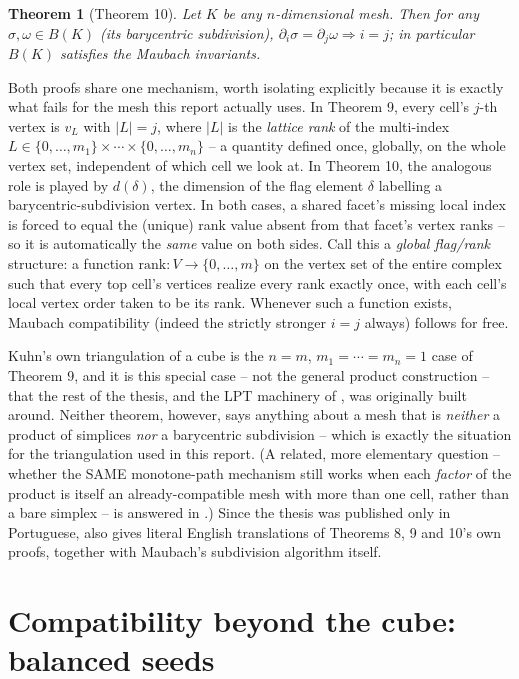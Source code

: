 \documentclass[11pt]{article}
\newtheorem*{thmthm}{Theorem}
\begin{document}
\begin{thmthm}[Theorem 10]
Let $K$ be any $n$-dimensional mesh. Then for any $\sigma,\omega\in B(K)$
(its barycentric subdivision), $\partial_i\sigma=\partial_j\omega
\Rightarrow i=j$; in particular $B(K)$ satisfies the Maubach invariants.
\end{thmthm}

Both proofs share one mechanism, worth isolating explicitly because it is
exactly what fails for the mesh this report actually uses. In Theorem 9,
every cell's $j$-th vertex is $v_L$ with $|L|=j$, where $|L|$ is the
\emph{lattice rank} of the multi-index $L\in\{0,\dots,m_1\}\times\cdots
\times\{0,\dots,m_n\}$ -- a quantity defined once, globally, on the whole
vertex set, independent of which cell we look at. In Theorem 10, the
analogous role is played by $d(\delta)$, the dimension of the flag element
$\delta$ labelling a barycentric-subdivision vertex. In both cases, a
shared facet's missing local index is forced to equal the (unique) rank
value absent from that facet's vertex ranks -- so it is automatically the
\emph{same} value on both sides. Call this a \emph{global flag/rank}
structure: a function $\mathrm{rank}:V\to\{0,\dots,m\}$ on the vertex set of
the entire complex such that every top cell's vertices realize every rank
exactly once, with each cell's local vertex order taken to be its rank.
Whenever such a function exists, Maubach compatibility (indeed the
strictly stronger $i=j$ always) follows for free.

Kuhn's own triangulation of a cube is the $n=m$, $m_1=\cdots=m_n=1$ case of
Theorem 9, and it is this special case -- not the general product
construction -- that the rest of the thesis, and the LPT machinery of
, was originally built around. Neither theorem, however, says
anything about a mesh that is \emph{neither} a product of simplices
\emph{nor} a barycentric subdivision -- which is exactly the situation for
the triangulation used in this report. (A related, more elementary
question -- whether the SAME monotone-path mechanism still works when each
\emph{factor} of the product is itself an already-compatible mesh with
more than one cell, rather than a bare simplex -- is answered in
.) Since the thesis was published only in Portuguese,
 also gives literal English translations of Theorems 8,
9 and 10's own proofs, together with Maubach's subdivision algorithm
itself.

\section{Compatibility beyond the cube: balanced seeds}
\label{sec:gaifullin}
\end{document}
